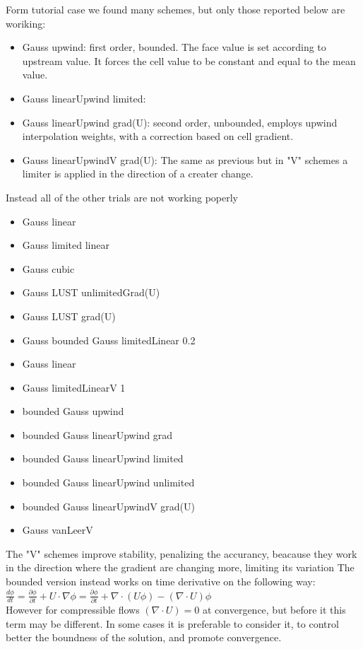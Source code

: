 \documentclass[a4paper,12pt]{article}
\begin{document}
Form tutorial case we found many schemes, but only those reported below are woriking:
\begin{itemize} 
\item {\ttfamily Gauss upwind}: first order, bounded. The face value is set according to upstream value. It forces the cell value to be constant and equal to the mean value.
 
 \item {\ttfamily Gauss linearUpwind limited}:
 
 \item {\ttfamily Gauss linearUpwind grad(U)}: second order, unbounded, employs upwind interpolation weights, with a correction based on cell gradient.
 
 \item {\ttfamily Gauss linearUpwindV grad(U)}: The same as previous but in "V" schemes a limiter is applied in the direction of a creater change.

\end{itemize} 
Instead all of the other trials are not working poperly
\begin{itemize} 

 \item {\ttfamily Gauss linear}
 \item {\ttfamily Gauss limited linear}
 \item {\ttfamily Gauss cubic}
 \item {\ttfamily Gauss LUST unlimitedGrad(U)}
 \item {\ttfamily Gauss LUST grad(U)}
 \item {\ttfamily Gauss bounded Gauss limitedLinear 0.2}
 \item {\ttfamily Gauss linear}
 \item {\ttfamily Gauss limitedLinearV 1}
 \item {\ttfamily bounded Gauss upwind}
 \item {\ttfamily bounded Gauss linearUpwind grad}
 \item {\ttfamily bounded Gauss linearUpwind limited}
 \item {\ttfamily bounded Gauss linearUpwind unlimited}
 \item {\ttfamily bounded Gauss linearUpwindV grad(U)}
 \item {\ttfamily Gauss vanLeerV}
\end{itemize} 
The "V" schemes improve stability, penalizing the accurancy, beacause they work in the direction where the gradient are changing more, limiting its variation
The bounded version instead works on time derivative on the following way:
\\$ \frac{d \phi}{dt} = \frac{\partial \phi}{\partial t} + U \cdot \nabla \phi = \frac{\partial \phi}{\partial t} + \nabla \cdot (U \phi) - ( \nabla \cdot U ) \phi $
\\ However for compressible flows $( \nabla \cdot U ) = 0 $ at convergence, but before it this term may be different. In some cases it is preferable to consider it, to control better the boundness of the solution, and promote convergence.
\end{document}
